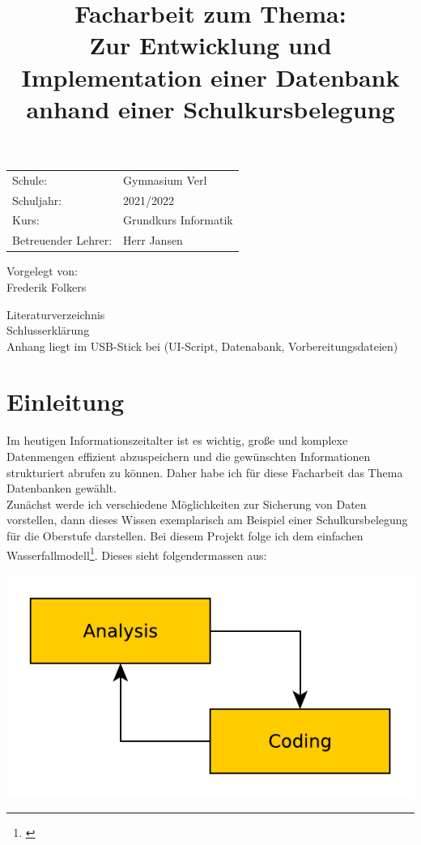 \documentclass[a4paper, 12pt]{article}
\title{\small Facharbeit zum Thema: \\ \Large Zur Entwicklung und Implementation einer Datenbank anhand einer Schulkursbelegung}
\date{

}
\theoremstyle{plain}
\theoremstyle{definition}
\begin{document}
	\maketitle
	
	
	\begin{center}
	\vspace{3cm}
	\begin{tabular}{ll}
	Schule: & Gymnasium Verl \\
	Schuljahr: & 2021/2022\\
	Kurs: & Grundkurs Informatik\\
	Betreuender Lehrer: & Herr Jansen\\
	\end{tabular} 
	\vfill
	Vorgelegt von:\\
	Frederik Folkers
	\end{center}
	\newpage
	\tableofcontents	
	\vspace{1cm}
	Literaturverzeichnis\\
	Schlusserklärung\\
	Anhang liegt im USB-Stick bei (UI-Script, Datenabank, Vorbereitungsdateien)
	\newpage	
	
	\onehalfspace
	\section{Einleitung}
	\label{sec:intro}
	Im heutigen Informationszeitalter ist es wichtig, große und komplexe Datenmengen effizient abzuspeichern und die gewünschten Informationen strukturiert abrufen zu können. Daher habe ich für diese Facharbeit das Thema Datenbanken gewählt. \\
	Zunächst werde ich verschiedene Möglichkeiten zur Sicherung von Daten vorstellen, dann dieses Wissen exemplarisch am Beispiel einer Schulkursbelegung für die Oberstufe darstellen. Bei diesem Projekt folge ich dem einfachen Wasserfallmodell\footnote{\cite{projModell}}. Dieses sieht folgendermassen aus:\\
	\begin{center}
	\includegraphics[scale=0.7]{projModell.pdf}
	\end{center}	
	
\end{document}

